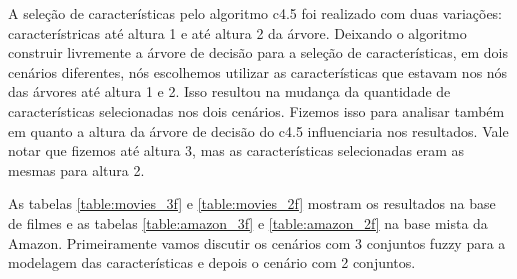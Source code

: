 \documentclass[template.tex]{subfiles}
\begin{document}
A seleção de características pelo algoritmo c4.5 foi realizado com duas variações: característricas até altura 1 e até altura 2 da árvore. Deixando o algoritmo construir livremente a árvore de decisão para a seleção de características, em dois cenários diferentes, nós escolhemos utilizar as características que estavam nos nós das árvores até altura 1 e 2. Isso resultou na mudança da quantidade de características selecionadas nos dois cenários. Fizemos isso para analisar também em quanto a altura da árvore de decisão do c4.5 influenciaria nos resultados. Vale notar que fizemos até altura 3, mas as características selecionadas eram as mesmas para altura 2. 

As tabelas \ref{table:movies_3f} e \ref{table:movies_2f} mostram os resultados na base de filmes e as tabelas \ref{table:amazon_3f} e \ref{table:amazon_2f} na base mista da Amazon. Primeiramente vamos discutir os cenários com 3 conjuntos fuzzy para a modelagem das características e depois o cenário com 2 conjuntos.
\end{document}
